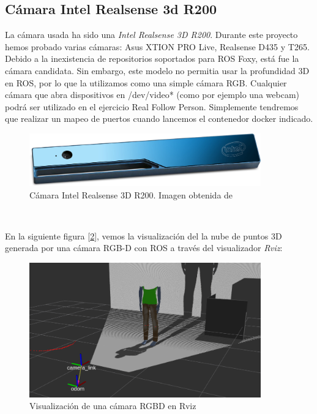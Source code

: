 \subsection{Cámara Intel Realsense 3d R200}
\label{subsec:intel_realsense_3d}

La cámara usada ha sido una \textit{Intel Realsense 3D R200}. Durante este proyecto hemos probado varias cámaras: Asus XTION PRO Live, Realsense D435 y T265. Debido a la inexistencia de repositorios soportados para ROS Foxy, está fue la cámara candidata. Sin embargo, este modelo no permitia usar la profundidad 3D en ROS, por lo que la utilizamos como una simple cámara RGB. Cualquier cámara que abra dispositivos en /dev/video* (como por ejemplo una webcam) podrá ser utilizado en el ejercicio Real Follow Person. Simplemente tendremos que realizar un mapeo de puertos cuando lancemos el contenedor docker indicado.\\

\begin{figure} [H]
  \begin{center}
    \includegraphics[width=10cm]{imagenes/cap3/r200.jpg}
  \end{center}
  \caption[Cámara Intel Realsense 3D R200]{Cámara Intel Realsense 3D R200. Imagen obtenida de \cite{R200}}
  \label{fig:camara_r200}
\end{figure}\

En la siguiente figura [\ref{fig:camara_rviz}], vemos la visualización del la nube de puntos 3D generada por una cámara RGB-D con ROS a través del visualizador \textit{Rviz}:\\

\begin{figure} [H]
  \begin{center}
    \includegraphics[width=10cm]{imagenes/cap3/camara-rviz.png}
  \end{center}
  \caption[Visualización de una cámara RGBD en Rviz]{Visualización de una cámara RGBD en Rviz}
  \label{fig:camara_rviz}
\end{figure}\



